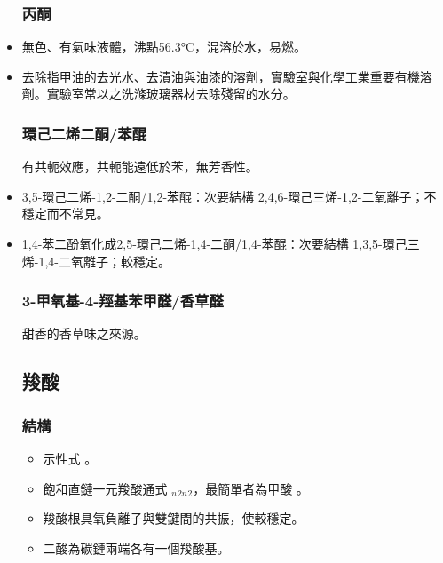 \documentclass[a4paper,12pt]{report}
\begin{document}
\begin{itemize}
\subsubsection{丙酮}
\bit
\item 無色、有氣味液體，沸點56.3°C，混溶於水，易燃。
\item 去除指甲油的去光水、去漬油與油漆的溶劑，實驗室與化學工業重要有機溶劑。實驗室常以之洗滌玻璃器材去除殘留的水分。
\eit
\subsubsection{環己二烯二酮/苯醌}
有共軛效應，共軛能遠低於苯，無芳香性。
\bit
\item 3,5-環己二烯-1,2-二酮/1,2-苯醌：次要結構 2,4,6-環己三烯-1,2-二氧離子；不穩定而不常見。
\item 1,4-苯二酚氧化成2,5-環己二烯-1,4-二酮/1,4-苯醌：次要結構 1,3,5-環己三烯-1,4-二氧離子；較穩定。
\eit
\subsubsection{3-甲氧基-4-羥基苯甲醛/香草醛}
甜香的香草味之來源。
\subsection{羧酸}
\subsubsection{結構}
\begin{itemize}
\item 示性式 。
\item 飽和直鏈一元羧酸通式 \rmC$_n$\rmH$_{2n}$\rmO$_2$，最簡單者為甲酸 。
\item 羧酸根具氧負離子與雙鍵間的共振，使較穩定。
\item 二酸為碳鏈兩端各有一個羧酸基。
\end{itemize}

\end{itemize}
\end{document}
